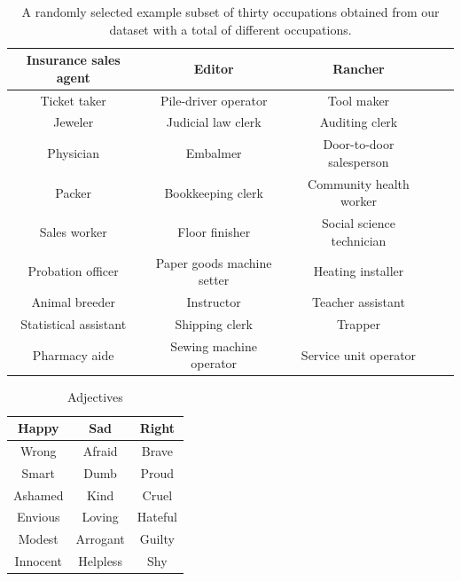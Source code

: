 \documentclass[fleqn,10pt]{article}
\begin{document}
\begin{table}[H]
\small{
	\centering
	\begin{tabular}{|c|c|c|c|c|}
	\hline
	Insurance sales agent 	& Editor 						& Rancher 					\\ \hline
	Ticket taker 			& Pile-driver operator 			& Tool maker 				\\ \hline
	Jeweler 				& Judicial law clerk 			& Auditing clerk 			\\ \hline
	Physician 				& Embalmer 						& Door-to-door salesperson 	\\ \hline
	Packer 					& Bookkeeping clerk 			& Community health worker 	\\ \hline
	Sales worker 			& Floor finisher 				& Social science technician \\ \hline
	Probation officer 		& Paper goods machine setter 	& Heating installer 		\\ \hline
	Animal breeder 			& Instructor 					& Teacher assistant 		\\ \hline
	Statistical assistant 	& Shipping clerk 				& Trapper 					\\ \hline
	Pharmacy aide 			& Sewing machine operator 		& Service unit operator 	\\ \hline
	\end{tabular}
	\caption{A randomly selected example subset of thirty occupations obtained from our dataset with a total of  different occupations.}
	\label{tab:occupations-examples}
	}
\end{table}

\begin{table}[H]
\small{
	\centering
	\begin{tabular}{|c|c|c|}
	\hline
	Happy 		& Sad 		& Right 	\\ \hline
	Wrong 		& Afraid	& Brave 	\\ \hline
	Smart		& Dumb		& Proud 	\\ \hline
	Ashamed		& Kind		& Cruel 	\\ \hline
	Envious		& Loving	& Hateful 	\\ \hline
	Modest 		& Arrogant	& Guilty	\\ \hline
	Innocent	& Helpless	& Shy		\\ \hline
	\end{tabular}
	\caption{Adjectives}
	\label{tab:adjectives}
	}
\end{table}
\end{document}
